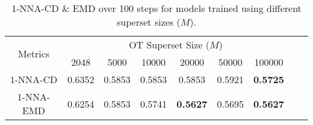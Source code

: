 \begin{table}
\centering
\vspace{-6mm}
\small
{
\caption{
1-NNA-CD \& EMD over 100 steps for models trained using different superset sizes ($M$).
%
} %
\label{tab:ot_size_comp}
\begin{tabular}{c|cccccccc}
\toprule
\multirow{2}{*}{Metrics} & \multicolumn{6}{c}{OT Superset Size ($M$)}                            \\ 
                         & 2048     & 5000        & 10000    & 20000       & 50000    & 100000   \\ \hline
1-NNA-CD                 & 0.6352 & 0.5853 & 0.5853 & 0.5853 & 0.5921 & \textbf{0.5725} \\
1-NNA-EMD                & 0.6254 & 0.5853 & 0.5741 & \textbf{0.5627} & 0.5695 & \textbf{0.5627} \\
\bottomrule
\end{tabular}
}
\end{table}